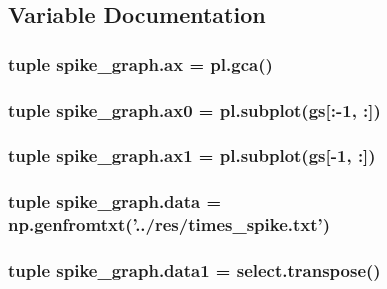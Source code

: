 \subsection{Variable Documentation}
\hypertarget{namespacespike__graph_a92f69e9db1c7f4f329d5915727b031e0}{
\subsubsection[{ax}]{\setlength{\rightskip}{0pt plus 5cm}tuple spike\-\_\-graph.\-ax = pl.\-gca()}}\label{namespacespike__graph_a92f69e9db1c7f4f329d5915727b031e0}
\hypertarget{namespacespike__graph_a69bc8269ca3daf787ef3712ac7661871}{
\subsubsection[{ax0}]{\setlength{\rightskip}{0pt plus 5cm}tuple spike\-\_\-graph.\-ax0 = pl.\-subplot({\bf gs}\mbox{[}\-:-\/1, \-:\mbox{]})}}\label{namespacespike__graph_a69bc8269ca3daf787ef3712ac7661871}
\hypertarget{namespacespike__graph_ada8edbab071f17401b2c0b018f027734}{
\subsubsection[{ax1}]{\setlength{\rightskip}{0pt plus 5cm}tuple spike\-\_\-graph.\-ax1 = pl.\-subplot({\bf gs}\mbox{[}-\/1, \-:\mbox{]})}}\label{namespacespike__graph_ada8edbab071f17401b2c0b018f027734}
\hypertarget{namespacespike__graph_a6f9be9e759aaafa3013bdc8d11a50915}{
\subsubsection[{data}]{\setlength{\rightskip}{0pt plus 5cm}tuple spike\-\_\-graph.\-data = np.\-genfromtxt('../res/times\-\_\-spike.\-txt')}}\label{namespacespike__graph_a6f9be9e759aaafa3013bdc8d11a50915}
\hypertarget{namespacespike__graph_a42e120d3042c368a5bc01bb0bec93035}{
\subsubsection[{data1}]{\setlength{\rightskip}{0pt plus 5cm}tuple spike\-\_\-graph.\-data1 = select.\-transpose()}}\label{namespacespike__graph_a42e120d3042c368a5bc01bb0bec93035}
